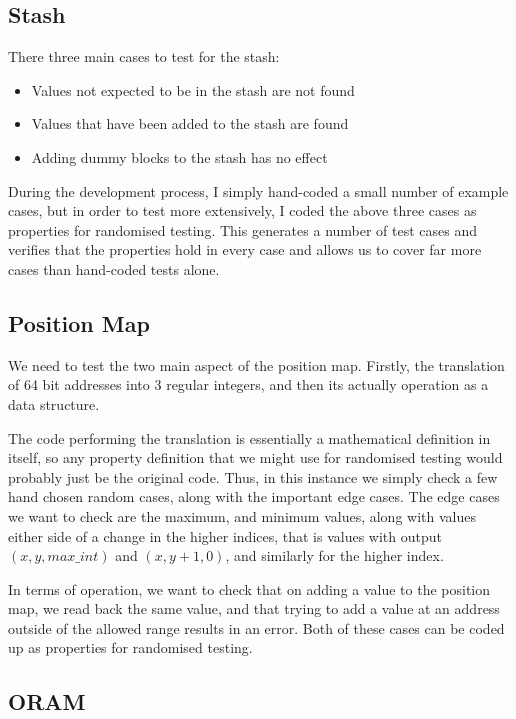 \documentclass[12pt,a4paper,twoside,openright]{report}
\begin{document}
\subsection{Stash}

There three main cases to test for the stash:

\begin{itemize}
  \item Values not expected to be in the stash are not found
  \item Values that have been added to the stash are found
  \item Adding dummy blocks to the stash has no effect
\end{itemize}

During the development process, I simply hand-coded a small number of example cases, but in order to test more extensively, I coded the above three cases as properties for randomised testing. This generates a number of test cases and verifies that the properties hold in every case and allows us to cover far more cases than hand-coded tests alone.

\subsection{Position Map}

We need to test the two main aspect of the position map. Firstly, the translation of 64 bit addresses into 3 regular integers, and then its actually operation as a data structure.

The code performing the translation is essentially a mathematical definition in itself, so any property definition that we might use for randomised testing would probably just be the original code. Thus, in this instance we simply check a few hand chosen random cases, along with the important edge cases. The edge cases we want to check are the maximum, and minimum values, along with values either side of a change in the higher indices, that is values with output $(x,y,max\_int)$ and $(x,y+1,0)$, and similarly for the higher index.

In terms of operation, we want to check that on adding a value to the position map, we read back the same value, and that trying to add a value at an address outside of the allowed range results in an error. Both of these cases can be coded up as properties for randomised testing.

\subsection{ORAM}
\end{document}
